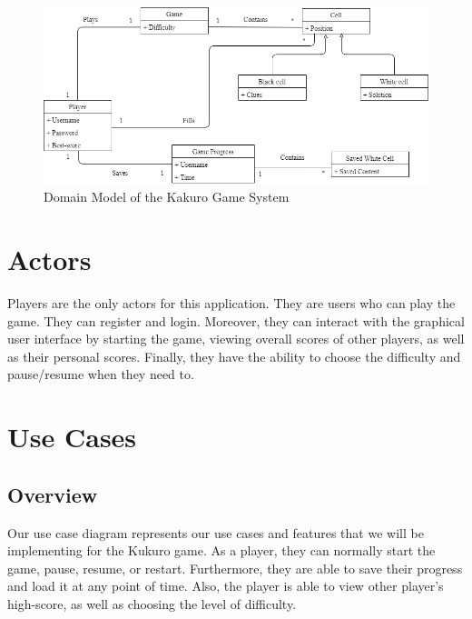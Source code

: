 \documentclass[12pt]{article}
\begin{document}
\begin{figure}[htbp]
    \includegraphics[width=1\textwidth]{DomainModel}
    \caption{Domain Model of the Kakuro Game System}
    \label{fig:DomainModel}
\end{figure}

\newpage

\section{Actors} 

Players are the only actors for this application. They are users who can play the game. They can register and login. Moreover, they can interact with the graphical user interface by starting the game, viewing overall scores of other players, as well as their personal scores. Finally, they have the ability to choose the difficulty and pause/resume when they need to.

\newpage

\section{Use Cases}

\subsection{Overview}
Our use case diagram represents our use cases and features that we will be implementing for the Kukuro game. As a player, they can normally start the game, pause, resume, or restart. Furthermore, they are able to save their progress and load it at any point of time. Also, the player is able to view other player's high-score, as well as choosing the level of difficulty.
\end{document}
